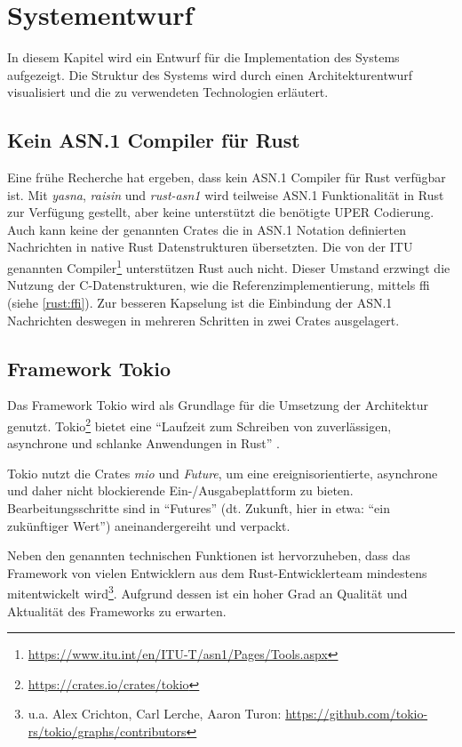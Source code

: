 
\chapter{Systementwurf}

In diesem Kapitel wird ein Entwurf für die Implementation des Systems aufgezeigt.
Die Struktur des Systems wird durch einen Architekturentwurf visualisiert und die zu verwendeten Technologien erläutert.

\section{Kein ASN.1 Compiler für Rust}

Eine frühe Recherche hat ergeben, dass kein ASN.1 Compiler für Rust verfügbar ist.
Mit \textit{yasna}, \textit{raisin} und \textit{rust-asn1} wird teilweise ASN.1 Funktionalität in Rust zur Verfügung gestellt, aber keine unterstützt die benötigte UPER Codierung.
Auch kann keine der genannten Crates die in ASN.1 Notation definierten Nachrichten in native Rust Datenstrukturen übersetzten.
Die von der ITU genannten Compiler\footnote{\url{https://www.itu.int/en/ITU-T/asn1/Pages/Tools.aspx}} unterstützen Rust auch nicht.
Dieser Umstand erzwingt die Nutzung der C-Datenstrukturen, wie die Referenzimplementierung, mittels \gls{ffi} (siehe \autoref{rust:ffi}).
Zur besseren Kapselung ist die Einbindung der ASN.1 Nachrichten deswegen in mehreren Schritten in zwei Crates ausgelagert.

\section{Framework Tokio}
\label{design:tokio}

Das Framework Tokio wird als Grundlage für die Umsetzung der Architektur genutzt.
Tokio\footnote{\url{https://crates.io/crates/tokio}} bietet eine \enquote{Laufzeit zum Schreiben von zuverlässigen, asynchrone und schlanke Anwendungen in Rust} \cite{rust:crate:tokio}.

Tokio nutzt die Crates \textit{mio} und \textit{Future}, um eine ereignisorientierte, asynchrone und daher nicht blockierende Ein-/Ausgabeplattform zu bieten.
Bearbeitungsschritte sind in \enquote{Futures} (dt. Zukunft, hier in etwa: \enquote{ein zukünftiger Wert}) aneinandergereiht und verpackt.

Neben den genannten technischen Funktionen ist hervorzuheben, dass das Framework von vielen Entwicklern aus dem Rust-Entwicklerteam mindestens mitentwickelt wird\footnote{u.a. Alex Crichton, Carl Lerche, Aaron Turon: \url{https://github.com/tokio-rs/tokio/graphs/contributors}}.
Aufgrund dessen ist ein hoher Grad an Qualität und Aktualität des Frameworks zu erwarten.

